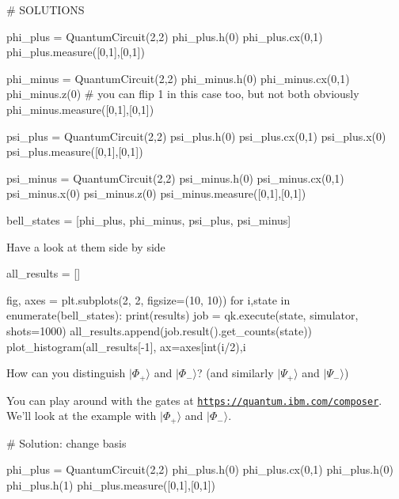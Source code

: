 \documentclass[%
oneside,                 %
final,                   %
10pt]{article}
\begin{document}
\bpycod
# SOLUTIONS

phi_plus = QuantumCircuit(2,2)
phi_plus.h(0)
phi_plus.cx(0,1)
phi_plus.measure([0,1],[0,1])


phi_minus = QuantumCircuit(2,2)
phi_minus.h(0)
phi_minus.cx(0,1)
phi_minus.z(0) # you can flip 1 in this case too, but not both obviously
phi_minus.measure([0,1],[0,1])


psi_plus = QuantumCircuit(2,2)
psi_plus.h(0)
psi_plus.cx(0,1)
psi_plus.x(0) 
psi_plus.measure([0,1],[0,1])


psi_minus = QuantumCircuit(2,2)
psi_minus.h(0)
psi_minus.cx(0,1)
psi_minus.x(0)
psi_minus.z(0)
psi_minus.measure([0,1],[0,1])


bell_states = [phi_plus, phi_minus, psi_plus, psi_minus]

\epycod

Have a look at them side by side









\bpycod
all_results = []

fig, axes = plt.subplots(2, 2, figsize=(10, 10))
for i,state in enumerate(bell_states):
    print(results)
    job = qk.execute(state, simulator, shots=1000)
    all_results.append(job.result().get_counts(state))
    plot_histogram(all_results[-1], ax=axes[int(i/2),i%

\epycod


How can you distinguish $|\Phi_+\rangle$ and $|\Phi_-\rangle$? (and
similarly $|\Psi_+\rangle$ and $|\Psi_-\rangle$)

You can play around with the gates at \href{{https://quantum.ibm.com/composer}}{\nolinkurl{https://quantum.ibm.com/composer}}.
We'll look at the example with $|\Phi_+\rangle$ and $|\Phi_-\rangle$.
























\bpycod
# Solution: change basis

phi_plus = QuantumCircuit(2,2)
phi_plus.h(0)
phi_plus.cx(0,1)
phi_plus.h(0)
phi_plus.h(1)
phi_plus.measure([0,1],[0,1])
\end{document}
